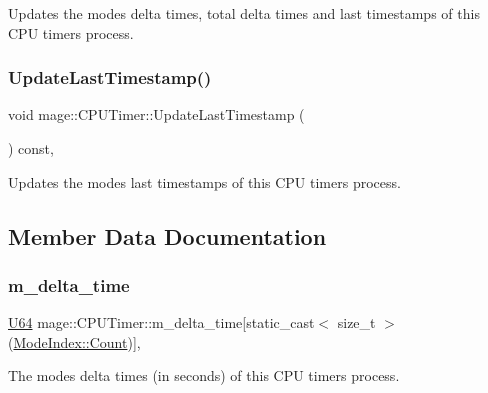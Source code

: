 Updates the modes\textquotesingle{} delta times, total delta times and last timestamps of this C\+PU timer\textquotesingle{}s process. \hypertarget{classmage_1_1_c_p_u_timer_aa956ede1a12c0c383e7fcc53e6f8c405}{}\label{classmage_1_1_c_p_u_timer_aa956ede1a12c0c383e7fcc53e6f8c405} 
\subsubsection{\texorpdfstring{Update\+Last\+Timestamp()}{UpdateLastTimestamp()}}
{\footnotesize\ttfamily void mage\+::\+C\+P\+U\+Timer\+::\+Update\+Last\+Timestamp (\begin{DoxyParamCaption}{ }\end{DoxyParamCaption}) const\hspace{0.3cm}{\ttfamily [private]}, {\ttfamily [noexcept]}}

Updates the modes\textquotesingle{} last timestamps of this C\+PU timer\textquotesingle{}s process. 

\subsection{Member Data Documentation}
\hypertarget{classmage_1_1_c_p_u_timer_a2ce9eda81a57934b172b426238d4587d}{}\label{classmage_1_1_c_p_u_timer_a2ce9eda81a57934b172b426238d4587d} 
\subsubsection{\texorpdfstring{m\+\_\+delta\+\_\+time}{m\_delta\_time}}
{\footnotesize\ttfamily \hyperlink{namespacemage_a6672cf3c861707ce4a3235a3eb43941d}{U64} mage\+::\+C\+P\+U\+Timer\+::m\+\_\+delta\+\_\+time\mbox{[}static\+\_\+cast$<$ size\+\_\+t $>$(\hyperlink{classmage_1_1_c_p_u_timer_a220f69be8f304f6fad61ccb358d278faae93f994f01c537c4e2f7d8528c3eb5e9}{Mode\+Index\+::\+Count})\mbox{]}\hspace{0.3cm}{\ttfamily [mutable]}, {\ttfamily [private]}}

The modes\textquotesingle{} delta times (in seconds) of this C\+PU timer\textquotesingle{}s process. \hypertarget{classmage_1_1_c_p_u_timer_a14b5ef7beba6c33769ac66ef171d0f0b}{}\label{classmage_1_1_c_p_u_timer_a14b5ef7beba6c33769ac66ef171d0f0b} 

